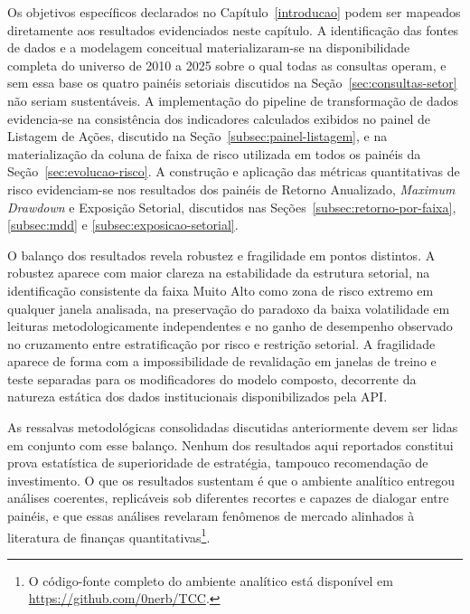 Os objetivos específicos declarados no Capítulo~\ref{introducao} podem ser mapeados diretamente aos resultados evidenciados neste capítulo. A identificação das fontes de dados e a modelagem conceitual materializaram-se na disponibilidade completa do universo de 2010 a 2025 sobre o qual todas as consultas operam, e sem essa base os quatro painéis setoriais discutidos na Seção~\ref{sec:consultas-setor} não seriam sustentáveis. A implementação do pipeline de transformação de dados evidencia-se na consistência dos indicadores calculados exibidos no painel de Listagem de Ações, discutido na Seção~\ref{subsec:painel-listagem}, e na materialização da coluna de faixa de risco utilizada em todos os painéis da Seção~\ref{sec:evolucao-risco}. A construção e aplicação das métricas quantitativas de risco evidenciam-se nos resultados dos painéis de Retorno Anualizado, \textit{Maximum Drawdown} e Exposição Setorial, discutidos nas Seções~\ref{subsec:retorno-por-faixa}, \ref{subsec:mdd} e \ref{subsec:exposicao-setorial}. 

O balanço dos resultados revela robustez e fragilidade em pontos distintos. A robustez aparece com maior clareza na estabilidade da estrutura setorial, na identificação consistente da faixa Muito Alto como zona de risco extremo em qualquer janela analisada, na preservação do paradoxo da baixa volatilidade em leituras metodologicamente independentes e no ganho de desempenho observado no cruzamento entre estratificação por risco e restrição setorial. A fragilidade aparece de forma com a impossibilidade de revalidação em janelas de treino e teste separadas para os modificadores do modelo composto, decorrente da natureza estática dos dados institucionais disponibilizados pela API.

As ressalvas metodológicas consolidadas discutidas anteriormente devem ser lidas em conjunto com esse balanço. Nenhum dos resultados aqui reportados constitui prova estatística de superioridade de estratégia, tampouco recomendação de investimento. O que os resultados sustentam é que o ambiente analítico entregou análises coerentes, replicáveis sob diferentes recortes e capazes de dialogar entre painéis, e que essas análises revelaram fenômenos de mercado alinhados à literatura de finanças quantitativas\footnote{O código-fonte completo do ambiente analítico está disponível em \url{https://github.com/0nerb/TCC}.}.